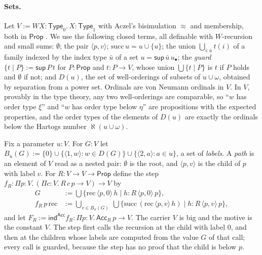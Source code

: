 \documentclass[10pt]{article}
\newcommand{\Prop}{\mathsf{Prop}}
\newcommand{\Type}{\mathsf{Type}}
\newcommand{\hartogs}{\aleph}
\newcommand{\ind}{\mathsf{ind}}
\newcommand{\Acc}{\mathsf{Acc}}
\begin{document}
\paragraph{Sets.}
Let $V:=W X{:}\Type_0.\,X:\Type_1$ with Aczel's bisimulation $\approx$ and
membership, both in $\Prop$ \cite{paper2}. We use the following closed
terms, all definable with $W$-recursion and small sums: $\emptyset$; the
pair $\langle p,v\rangle$; $\mathrm{succ}\,u=u\cup\{u\}$; the union
$\bigcup_{i:\bar u}t(i)$ of a family indexed by the index type $\bar u$ of a
set $u=\mathsf{sup}\,\bar u\,u_\bullet$; the \emph{guard}
$\{t\mid P\}:=\mathsf{sup}\,P\,t$ for $P:\Prop$ and $t:P\to V$, whose union
$\bigcup\{t\mid P\}$ is $t$ if $P$ holds and $\emptyset$ if not; and
$D(u)$, the set of well-orderings of subsets of $u\cup\omega$, obtained by
separation from a power set. Ordinals are von Neumann ordinals in $V$.
In $V$, provably in the type theory, any two well-orderings are
comparable, so ``$w$ has order type $\xi$'' and ``$w$ has order type below
$\eta$'' are propositions with the expected properties, and the order
types of the elements of $D(u)$ are exactly the ordinals below the
Hartogs number $\hartogs(u\cup\omega)$.

\begin{definition}\label{def:mat}
Fix a parameter $u:V$. For $G:V$ let
$B_u(G):=\{0\}\cup\{\langle 1,w\rangle: w\in D(G)\}\cup\{\langle 2,a\rangle:a\in u\}$,
a set of \emph{labels}. A \emph{path} is an element of $V$ read as a
nested pair: $\emptyset$ is the root, and $\langle p,v\rangle$ is the child of
$p$ with label $v$. For $R:V\to V\to\Prop$ define the step
$f_R:\Pi p{:}V.\,(\Pi c{:}V.\,R\,c\,p\to V)\to V$ by
\begin{align*}
G&:=\textstyle\bigcup\{\mathrm{rec}\,\langle p,0\rangle\,h\mid h:R\,\langle p,0\rangle\,p\},\\
f_R\,p\,\mathrm{rec}&:=\textstyle\bigcup_{v\in B_u(G)}\ \bigcup\{\mathrm{succ}\,(\mathrm{rec}\,\langle p,v\rangle\,h)\mid h:R\,\langle p,v\rangle\,p\},
\end{align*}
and let $F_R:=\ind^{\Acc}f_R:\Pi p{:}V.\,\Acc_R\,p\to V$. The carrier $V$
is big and the motive is the constant $V$. The step first calls the
recursion at the child with label $0$, and then at the children whose
labels are computed from the value $G$ of that call; every call is
guarded, because the step has no proof that the child is below $p$.
\end{definition}
\end{document}
